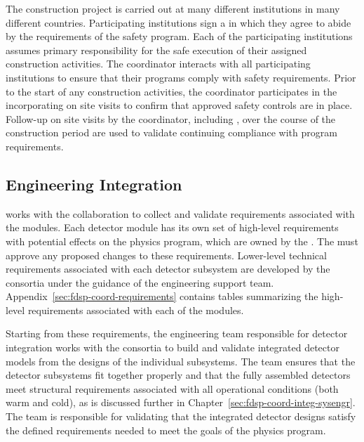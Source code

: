 The  construction project is carried out at many different
institutions in many different countries.  Participating institutions
sign a  in which they agree to abide by the requirements of
the  safety program.  Each of the participating
institutions assumes primary responsibility for the safe execution of
their assigned construction activities.  The  
coordinator interacts with all participating institutions to
ensure that their programs comply with  safety
requirements.  Prior to the start of any construction activities, the
  coordinator participates in the 
incorporating on site visits to confirm that approved safety controls
are in place.  Follow-up on site visits by the  
coordinator, including , over the course of the
construction period are used to validate continuing compliance with
program requirements.

\subsection{Engineering Integration}

  works with the collaboration to 
collect and validate requirements associated with the  
modules.  Each detector module has its own set of high-level 
requirements with potential effects on the  physics 
program, which are owned by the  .  The
 must approve any proposed changes to these 
requirements.  Lower-level technical requirements associated 
with each detector subsystem are developed by the consortia 
under the guidance of the  engineering support team.  
Appendix~\ref{sec:fdsp-coord-requirements} contains tables 
summarizing the high-level requirements associated with each of 
the  modules.

Starting from these requirements, the  engineering team
responsible for detector integration works with the
 consortia to build and validate integrated detector
models from the designs of the individual subsystems.  The team
ensures that the detector subsystems fit together properly and 
that the fully assembled detectors meet structural requirements 
associated with all operational conditions (both warm and cold), as 
is discussed further in Chapter~\ref{sec:fdsp-coord-integ-sysengr}.  
The team is responsible for validating that the integrated detector 
designs satisfy the defined requirements needed to meet the goals 
of the  physics program.

